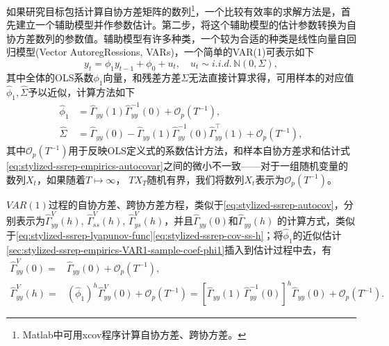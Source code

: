 如果研究目标包括计算自协方差矩阵的数列\footnote{Matlab中可用xcov程序计算自协方差、跨协方差。}，一个比较有效率的求解方法是，首先建立一个辅助模型并作参数估计。第二步，将这个辅助模型的估计参数转换为自协方差数列的参数值。辅助模型有许多种类，一个较为合适的种类是线性向量自回归模型(Vector AutoregRessions, VARs)，一个简单的VAR(1)可表示如下
\begin{equation}
  \label{sec:stylized-ssrep-empirics-var1-def}
  y_{t} = \phi_{1} y_{t-1} + \phi_{0} + u_{t}, \quad u_{t} \sim i.i.d. \, \mathbb{N} \left(0, \Sigma \right),
\end{equation}
其中全体的OLS系数$\phi_{1}$向量，和残差方差$\Sigma$无法直接计算求得，可用样本的对应值$\hat{\phi}_{1}, \widehat{\Sigma}$予以近似，计算方法如下
\begin{align}
  \label{sec:stylized-ssrep-empirics-VAR1-sample-coef-phi1}
  \hat{\phi}_{1} & = \widehat{\Gamma}_{yy} \left( 1 \right)
  \widehat{\Gamma}_{yy}^{-1} \left( 0 \right) + \mathcal{O}_{p} \left( T ^{-1} \right), \\
  \label{sec:stylized-ssrep-empirics-VAR1-sample-coef-resvar}
  \widehat{\Sigma} & = \widehat{\Gamma}_{yy} \left( 0 \right)
  - \widehat{\Gamma}_{yy} \left( 1 \right)
  \widehat{\Gamma}_{yy}^{-1} \left( 0 \right)
  \widehat{\Gamma}_{yy}^{\top} \left( 1 \right)
  + \mathcal{O}_{p} \left( T ^{-1} \right),
\end{align}
其中$\mathcal{O}_{p} \left( T^{-1} \right)$用于反映OLS定义式的系数估计方法，和样本自协方差求和估计式\eqref{eq:stylized-ssrep-empirics-autocovar}之间的微小不一致——对于一组随机变量的数列$X_{t}$，如果随着$T \mapsto \infty$， $T X_{T}$随机有界，我们将数列$X_{t}$表示为$\mathcal{O}_{p} \left( T^{-1} \right)$。

$VAR(1)$过程的自协方差、跨协方差方程，类似于\eqref{eq:stylized-ssrep-autocov}，分别表示为$\widehat{\Gamma}_{yy}^{V}(h),\, \widehat{\Gamma}_{ss}^{V}(h), \, \widehat{\Gamma}_{ys}^{V}(h)$，并且$\widehat{\Gamma}_{yy}(0)$和$\widehat{\Gamma}_{yy}(h)$
的计算方式，类似于\eqref{eq:stylized-ssrep-lyapunov-func}\eqref{eq:stylized-ssrep-cov-ss-h}；将$\hat{\phi}_{1}$的近似估计\eqref{sec:stylized-ssrep-empirics-VAR1-sample-coef-phi1}插入到估计过程中去，有
\begin{align}
  \label{eq:stylized-ssrep-var1-autocov-yy0}
  \widehat{\Gamma}_{yy}^{V} \left( 0 \right) = & \widehat{\Gamma}_{yy} \left( 0 \right) + \mathcal{O}_{p} \left( T^{-1} \right), \\
  \label{eq:stylized-ssrep-var1-autocov-yyh}
  \widehat{\Gamma}_{yy}^{V} \left( h \right) = &
  \left( \hat{\phi}_{1} \right)^{h} \widehat{\Gamma}_{yy}^{V} \left( 0 \right) + \mathcal{O}_{p} \left( T^{-1} \right)
  = \left[ \widehat{\Gamma}_{yy} \left( 1 \right) \,
  \widehat{\Gamma}_{yy}^{-1} \left( 0 \right)
  \right]^{h}
  \widehat{\Gamma}_{yy} \left( 0 \right)
  + \mathcal{O}_{p} \left( T^{-1} \right).
\end{align}

